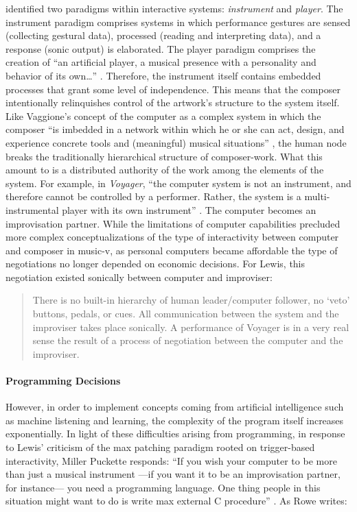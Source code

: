 \citeauthor{Row92:Int} \parencite{Row92:Int} identified two paradigms within interactive systems: \textit{instrument} and \textit{player}. The instrument paradigm comprises systems in which performance gestures are sensed (collecting gestural data), processed (reading and interpreting data), and a response (sonic output) is elaborated. The player paradigm comprises the creation of ``an artificial player, a musical presence with a personality and behavior of its own\dots'' \parencite[Chapter~1]{Row92:Int}. Therefore, the instrument itself contains embedded processes that grant some level of independence. This means that the composer intentionally relinquishes control of the artwork's structure to the system itself. Like Vaggione's concept of the computer as a complex system in which the composer ``is imbedded in a network within which he or she can act, design, and experience concrete tools and (meaningful) musical situations'' \parencite{Vag01:Som}, the human node breaks the traditionally hierarchical structure of composer-work. What this amount to is a distributed authority of the work among the elements of the system. For example, in \textit{Voyager}, ``the computer system is not an instrument, and therefore cannot be controlled by a performer. Rather, the system is a multi-instrumental player with its own instrument'' \parencite[103]{Lew99:Int}. The computer becomes an improvisation partner. While the limitations of computer capabilities precluded more complex conceptualizations of the type of interactivity between computer and composer in \gls{music-v}, as personal computers became affordable the type of negotiations no longer depended on economic decisions. For Lewis, this  negotiation existed sonically between computer and improviser:

\begin{quote}
	There is no built-in hierarchy of human leader/computer follower, no `veto' buttons, pedals, or cues. All communication between the system and the improviser takes place sonically. A performance of Voyager is in a very real sense the result of a process of negotiation between the computer and the improviser. \parencite[104]{Lew99:Int}
\end{quote}

\paragraph{Programming Decisions}
However, in order to implement concepts coming from artificial intelligence such as machine listening and learning, the complexity of the program itself increases exponentially. In light of these difficulties arising from programming, in response to Lewis' criticism of the \gls{max} patching paradigm rooted on trigger-based interactivity, Miller Puckette responds: ``If you wish your computer to be more than just a musical instrument ---if you want it to be an improvisation partner, for instance--- you need a programming language. One thing people in this situation might want to do is write \gls{max} external C procedure'' \parencite[8]{Lew93:Put}. As Rowe writes:

